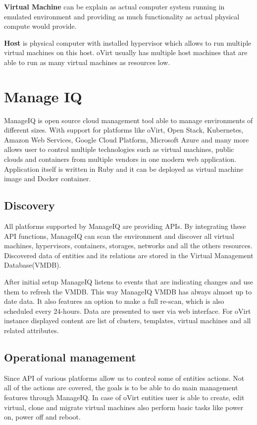 \textbf{Virtual Machine} can be explain as actual computer system running in emulated environment and providing as much functionality as actual physical compute would provide.

\textbf{Host} is physical computer with installed hypervisor which allows to run multiple virtual machines on this host. oVirt usually has multiple host machines that are able to run as many virtual machines as resources low.

\chapter{Manage IQ}
ManageIQ\cite{ManageIQarchitecture} is open source cloud management tool able to manage environments of different sizes. With support for platforms like oVirt, Open Stack, Kubernetes, Amazon Web Services, Google Cloud Platform, Microsoft Azure and many more allows user to control multiple technologies such as virtual machines, public clouds and containers from multiple vendors in one modern web application.
Application itself is written in Ruby and it can be deployed as virtual machine image and Docker container.

\section{Discovery}
All platforms supported by ManageIQ are providing APIs. By integrating these API functions, ManageIQ can scan the environment and discover all virtual machines, hypervisors, containers, storages, networks and all the others resources. Discovered data of entities and its relations are stored in the Virtual Management Database(VMDB). 

After initial setup ManageIQ listens to events that are indicating changes and use them to refresh the VMDB. This way ManageIQ VMDB has always almost up to date data. It also features an option to make a full re-scan, which is also scheduled every 24-hours.
Data are presented to user via web interface. For oVirt instance displayed content are list of clusters, templates, virtual machines and all related attributes.

\section{Operational management}
Since API of various platforms allow us to control some of entities actions. Not all of the actions are covered, the goals is to be able to do main management features through ManageIQ. 
In case of oVirt entities user is able to create, edit virtual, clone and migrate virtual machines also perform basic tasks like power on, power off and reboot.

